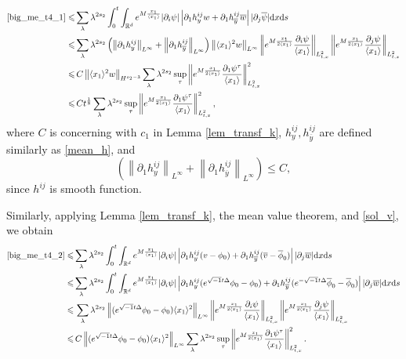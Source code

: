 \documentclass[10pt,twoside,a4paper]{article}
\numberwithin{equation}{section}\allowdisplaybreaks
\def\leq{\leqslant}
\begin{document}
\begin{align*}
	\eqref{big_me_t4_1} \leq & \sum_{\lambda} \lambda^{ 2s_2}\int_0^t\int_{\mathbb{R}^d}   e^{M \frac{x_1}{\langle x_1\rangle} }    |\partial_i \psi| \left|\partial_1 h^{ij}_y w+\partial_1 h^{ij}_{\overline{y}}\overline{w}\right| |\partial_j \overline{\psi} |  \mathrm{d} x  \mathrm{d} s\\
	\leq &\sum_{\lambda} \lambda^{ 2s_2} \left(\left\|\partial_1 h^{ij}_y\right\|_{L^\infty}+\left\|\partial_1 h^{ij}_{\overline{y}}\right\|_{L^\infty}\right)     \left\|\langle x_1\rangle^2 w\right\|_{L^\infty}\left\| e^{M \frac{x_1}{2\langle x_1\rangle} } \frac{\partial_i \psi  }{\langle x_1\rangle }  \right\|_{L^2_{t,x}} \left\| e^{M \frac{x_1}{2\langle x_1\rangle} } \frac{\partial_j \psi  }{\langle x_1\rangle }  \right\|_{L^2_{t,x}}\\
	\leq &\, C\left\|\langle x_1\rangle^2 w\right\|_{H^{s_2-3}}\sum_{\lambda} \lambda^{ 2s_2}  \sup_{\tau} \left\| e^{M \frac{x_1}{2\langle x_1\rangle} } \frac{\partial_1 \psi^\tau }{\langle x_1\rangle }  \right\|_{L^2_{t,x}}^2\\
	\leq & \, Ct^{\frac 18}  \sum_{\lambda} \lambda^{ 2s_2}\sup_{\tau}\left\| e^{M \frac{x_1}{2\langle x_1\rangle} } \frac{\partial_1 \psi^\tau }{\langle x_1\rangle }  \right\|_{L^2_{t,x}}^2,
\end{align*}
where $ C $ is concerning with $ c_1 $ in Lemma \ref{lem_transf_k}, $h^{ij}_y, h^{ij}_{\overline{y}}$ 
 are defined similarly as \eqref{mean_h}, and
 $$ \left(\left\|\partial_1 h^{ij}_y\right\|_{L^\infty}+\left\|\partial_1 h^{ij}_{\overline{y}}\right\|_{L^\infty}\right) \leq C, $$ since  $ h^{ij} $ is smooth function.

Similarly, applying Lemma \ref{lem_transf_k}, the mean value theorem, and \eqref{sol_v}, we obtain
\begin{align*}
	\eqref{big_me_t4_2} \leq &\sum_{\lambda} \lambda^{ 2s_2}\int_0^t\int_{\mathbb{R}^d}   e^{M \frac{x_1}{\langle x_1\rangle} }       |\partial_i \psi| \left| \partial_1 h^{ij}_y (v-\phi_0)+\partial_1 h^{ij}_{\overline{y}}(\overline{v}-\overline{\phi}_0)\right| | \partial_j\overline{w} |  \mathrm{d} x  \mathrm{d} s\\
	\leq & \sum_{\lambda} \lambda^{ 2s_2}\int_0^t\int_{\mathbb{R}^d} e^{M \frac{x_1}{\langle x_1\rangle} }     |\partial_i \psi| \left|\partial_1h^{ij}_y ( e^{\sqrt{-1} t\Delta } \phi_0-\phi_0)+\partial_1 h^{ij}_{\overline{y}}( e^{-\sqrt{-1} t\Delta }\overline{\phi}_0 -\overline{\phi}_0)\right| |\partial_j\overline{w} |  \mathrm{d} x  \mathrm{d} s\\
	\leq & \,   \sum_{\lambda} \lambda^{ 2s_2} \left\|(e^{\sqrt{-1} t\Delta } \phi_0-\phi_0)\langle x_1\rangle^2\right\|_{L^{\infty}}\left\| e^{M \frac{x_1}{2\langle x_1\rangle} } \frac{\partial_i \psi  }{\langle x_1\rangle }  \right\|_{L^2_{t,x}} \left\| e^{M \frac{x_1}{2\langle x_1\rangle} } \frac{\partial_j \psi  }{\langle x_1\rangle }  \right\|_{L^2_{t,x}}\\
	\leq &\, C     \left\|(e^{\sqrt{-1} t\Delta } \phi_0-\phi_0)\langle x_1\rangle^2\right\|_{L^{\infty}}   \sum_{\lambda} \lambda^{ 2s_2}\sup_{\tau} \left\| e^{M \frac{x_1}{2\langle x_1\rangle} } \frac{\partial_1 \psi^\tau }{\langle x_1\rangle }  \right\|_{L^2_{t,x}}^2.
\end{align*}
\end{document}
